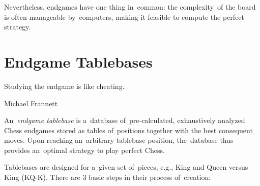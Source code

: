 Nevertheless, endgames have one thing in~common:
the complexity~of the board is often manageable by~computers, making it feasible to compute the perfect strategy.

\section{Endgame Tablebases}
\epigraph{
  Studying the endgame is like cheating.
}{Michael Frannett}
An~\emph{endgame tablebase} is a~database of~pre-calculated, exhaustively analyzed Chess endgames stored as tables of~positions together with the best consequent moves.
Upon reaching an~arbitrary tablebase position, the~database thus provides an~optimal strategy to play perfect Chess.

Tablebases are designed for a~given set of~pieces, e.g., \king King and \queen Queen versus \kingB King (KQ-K).
There are 3 basic steps in their process of~creation:

